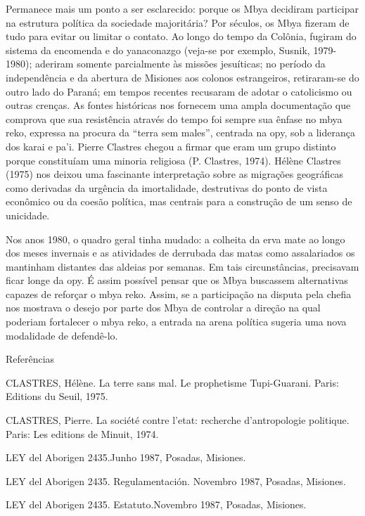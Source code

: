 \documentclass{article}
\begin{document}
Permanece mais um ponto a ser esclarecido: porque os Mbya decidiram
participar na estrutura pol\'itica da sociedade majorit\'aria? Por
s\'eculos, os Mbya fizeram de tudo para evitar ou limitar o contato. Ao
longo do tempo da Col\^onia, fugiram do sistema da encomenda e do
yanaconazgo (veja-se por exemplo, Susnik, 1979-1980); aderiram somente
parcialmente \`as miss\~oes jesu\'iticas; no per\'iodo da
independ\^encia e da abertura de Misiones aos colonos estrangeiros,
retiraram-se do outro lado do Paran\'a; em tempos recentes recusaram de
adotar o catolicismo ou outras cren\c{c}as. As fontes hist\'oricas nos
fornecem uma ampla documenta\c{c}\~ao que comprova que sua
resist\^encia atrav\'es do tempo foi sempre sua \^enfase no mbya reko,
expressa na procura da {\textquotedblleft}terra sem
males{\textquotedblright}, centrada na opy, sob a lideran\c{c}a dos
karai e pa{\textquoteright}i. Pierre Clastres chegou a firmar que eram
um grupo distinto porque constitu\'iam uma minoria religiosa (P.
Clastres, 1974). H\'el\`ene Clastres (1975) nos deixou uma fascinante
interpreta\c{c}\~ao sobre as migra\c{c}\~oes geogr\'aficas como
derivadas da urg\^encia da imortalidade, destrutivas do ponto de vista
econ\^omico ou da coes\~ao pol\'itica, mas centrais para a
constru\c{c}\~ao de um senso de unicidade. 

Nos anos 1980, o quadro geral tinha mudado: a colheita da erva mate ao
longo dos meses invernais e as atividades de derrubada das matas como
assalariados os mantinham distantes das aldeias por semanas. Em tais
circunst\^ancias, precisavam ficar longe da opy. \'E assim poss\'ivel
pensar que os Mbya buscassem alternativas capazes de refor\c{c}ar o
mbya reko. Assim, se a participa\c{c}\~ao na disputa pela chefia nos
mostrava o desejo por parte dos Mbya de controlar a dire\c{c}\~ao na
qual poderiam fortalecer o mbya reko, a entrada na arena pol\'itica
sugeria uma nova modalidade de defend\^e-lo. 

Refer\^encias

CLASTRES, H\'el\`ene. La terre sans mal. Le prophetisme Tupi-Guarani.
Paris: Editions du Seuil, 1975.

CLASTRES, Pierre. La soci\'et\'e contre l{\textquoteright}etat:
recherche d{\textquoteright}antropologie politique. Paris: Les editions
de Minuit, 1974.

LEY del Aborigen 2435.Junho 1987, Posadas, Misiones.

LEY del Aborigen 2435. Regulamentaci\'on. Novembro 1987, Posadas,
Misiones.

LEY del Aborigen 2435. Estatuto.Novembro 1987, Posadas, Misiones.
\end{document}
